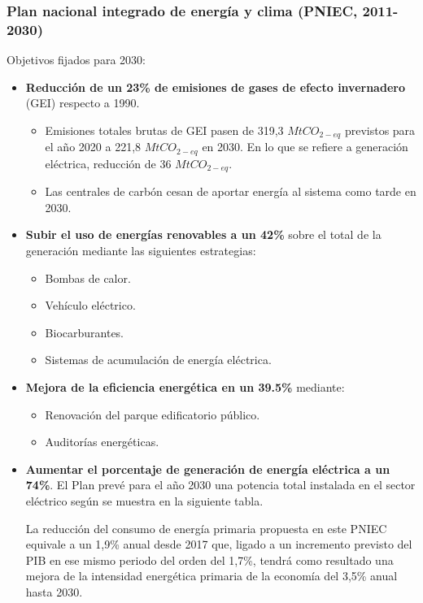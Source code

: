 			\subsubsection{Plan nacional integrado de energía y clima (PNIEC, 2011-2030)}
				Objetivos fijados para 2030:
				\begin{itemize}
					\item 
						\textbf{Reducción de un 23\% de emisiones de gases de efecto invernadero} (GEI) respecto a 1990.
						\begin{itemize}
							\item 
								Emisiones totales brutas de GEI pasen de 319,3 $\textit{MtCO}_{2-eq}$ previstos para el año 2020 a 221,8 $\textit{MtCO}_{2-eq}$ en 2030. En lo que se refiere a generación eléctrica, reducción de 36 $\textit{MtCO}_{2-eq}$.
							\item 
								Las centrales de carbón cesan de aportar energía al sistema como tarde en 2030.
						\end{itemize}
						
					\item 
						\textbf{Subir el uso de energías renovables a un 42\%} sobre el total de la generación mediante las siguientes estrategias:
						\begin{itemize}
							\item Bombas de calor.
							\item Vehículo eléctrico.
							\item Biocarburantes.
							\item Sistemas de acumulación de energía eléctrica.
						\end{itemize}
						
					\item 	
						\textbf{Mejora de la eficiencia energética en un 39.5\%} mediante:
						\begin{itemize}
							\item Renovación del parque edificatorio público.
							\item Auditorías energéticas.
						\end{itemize}
						
					\item 
						\textbf{Aumentar el porcentaje de generación de energía eléctrica a un 74\%}. El Plan prevé para el año 2030 una potencia total instalada en el sector eléctrico según se muestra en la siguiente tabla.
						
						\quad La reducción del consumo de energía primaria propuesta en este PNIEC equivale a un 1,9\% anual desde 2017
						que, ligado a un incremento previsto del PIB en ese mismo periodo del orden del 1,7\%, tendrá como resultado
						una mejora de la intensidad energética primaria de la economía del 3,5\% anual hasta 2030.
						

\end{itemize}
